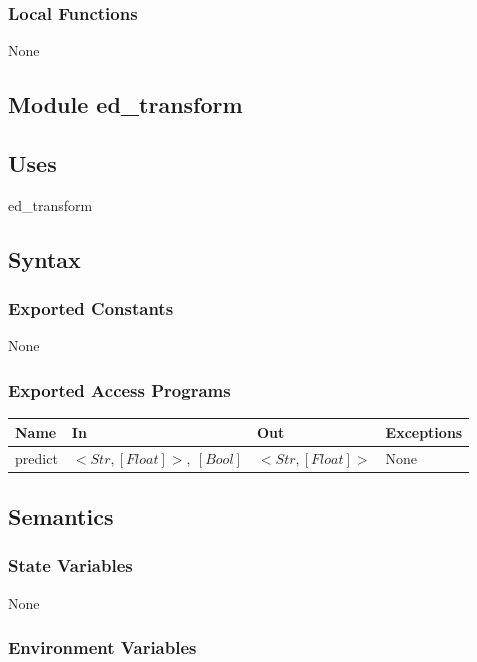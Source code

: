 \documentclass[12pt, titlepage]{article}
\begin{document}
\subsubsection{Local Functions}

None


\subsection{Module ed\_transform}

\subsection{Uses}

ed\_transform

\subsection{Syntax}

\subsubsection{Exported Constants}

None

\subsubsection{Exported Access Programs}

\begin{center}
\begin{tabular}{p{3cm} p{5cm} p{4cm} p{3cm}}
\hline
\textbf{Name} & \textbf{In} & \textbf{Out} & \textbf{Exceptions} \\
\hline
predict & $<Str, [Float]>,\ [Bool]$ & $<Str, [Float]>$ & None \\
\hline
\end{tabular}
\end{center}

\subsection{Semantics}

\subsubsection{State Variables}

None

\subsubsection{Environment Variables}
\end{document}
